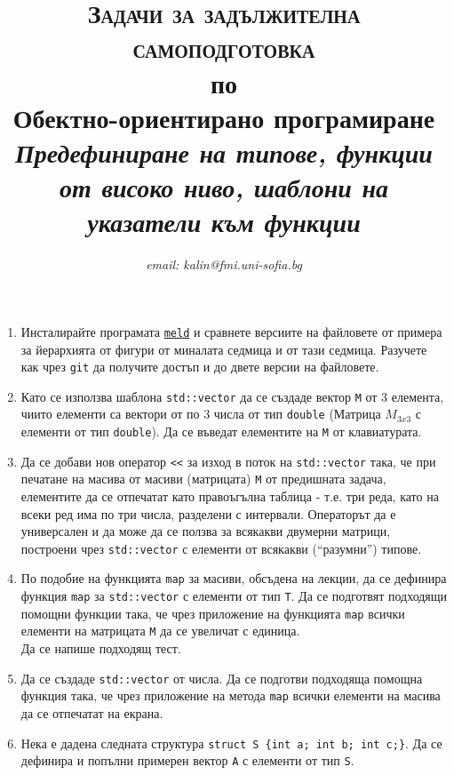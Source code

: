 \documentclass[12pt,a4paper]{article}
\author{\textit{email: kalin@fmi.uni-sofia.bg}}
\title{\textsc{Задачи за задължителна самоподготовка} \\
по \\
Обектно-ориентирано програмиране\\
\textit{Предефиниране на типове, функции от високо ниво, шаблони на указатели към функции}}
\begin{document}
\maketitle


\begin{enumerate}

\item Инсталирайте програмата \href{http://meldmerge.org/}{\texttt{meld}} и сравнете версиите на файловете от примера за йерархията от фигури от миналата седмица и от тази седмица. Разучете как чрез \texttt{git} да получите достъп и до двете версии на файловете.

\item Като се използва шаблона \texttt{std::vector} да се създаде вектор \texttt{M} от 3 елемента, чиито елементи са вектори от по 3 числа от тип \texttt{double} (Матрица $M_{3x3}$ с елементи от тип \texttt{double}). Да се въведат елементите на \texttt{M} от клавиатурата.

\item Да се добави нов оператор \texttt{<{}<} за изход в поток на \texttt{std::vector} така, че при печатане на масива от масиви (матрицата) \texttt{M} от предишната задача, елементите да се отпечатат като правоъгълна таблица - т.е. три реда, като на всеки ред има по три числа, разделени с интервали. Операторът да е универсален и да може да се ползва за всякакви двумерни матрици, построени чрез \texttt{std::vector} с елементи от всякакви (``разумни'') типове.

\item По подобие на функцията \texttt{map} за масиви, обсъдена на лекции, да се дефинира функция \texttt{map} за \texttt{std::vector} с елементи от тип \texttt{T}. Да се подготвят подходящи помощни функции така, че чрез приложение на функцията \texttt{map} всички елементи на матрицата \texttt{M} да се увеличат с единица. \\

Да се напише подходящ тест.

\item Да се създаде \texttt{std::vector} от числа. Да се подготви подходяща помощна функция така, че чрез приложение на метода \texttt{map} всички елементи на масива да се отпечатат на екрана.

\item Нека е дадена следната структура \texttt{struct S \{int a; int b; int c;\}}. Да се дефинира и попълни примерен вектор \texttt{A} с елементи от тип \texttt{S}.


\end{enumerate}
\end{document}
